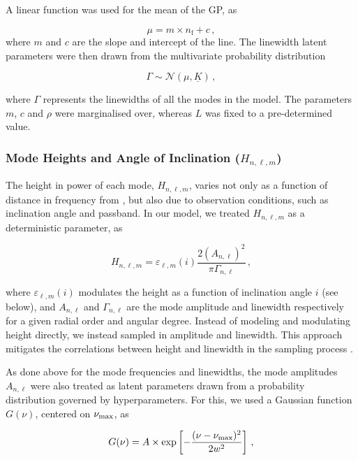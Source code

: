A linear function was used for the mean of the GP, as

\begin{equation}\label{eq:gpmean}
	\mu = m \times n_{\textrm{f}} + c\, ,
\end{equation}
where $m$ and $c$ are the slope and intercept of the line. The linewidth latent parameters were then drawn from the multivariate probability distribution

\begin{equation}\label{eq:gammagp}
	\Gamma \sim \mathcal{N}(\mu, \underline{K})\, ,
\end{equation}

\noindent where $\Gamma$ represents the linewidths of all the modes in the model. The parameters $m$, $c$ and $\rho$ were marginalised over, whereas $L$ was fixed to a pre-determined value.

\subsubsection{Mode Heights and Angle of Inclination ($H_{n,\ell,m}$)}
The height in power of each mode, $H_{n, \ell, m}$, varies not only as a function of distance in frequency from \numax, but also due to observation conditions, such as inclination angle and passband. In our model, we treated $H_{n, \ell, m}$ as a deterministic parameter, as

\begin{equation}\label{eq:height}
	H_{n, \ell, m} =  \varepsilon_{\ell, m}(i) \frac{2 (A_{n, \ell})^2}{\pi \Gamma_{n, \ell}}\, ,
\end{equation}

\noindent where $\varepsilon_{\ell, m}(i)$ modulates the height as a function of inclination angle $i$ (see below), and $A_{n, \ell}$ and $\Gamma_{n, \ell}$ are the mode amplitude and linewidth respectively for a given radial order and angular degree. Instead of modeling and modulating height directly, we instead sampled in amplitude and linewidth. This approach mitigates the correlations between height and linewidth in the sampling process \cite{toutain+appourchaux1994}.

As done above for the mode frequencies and linewidths, the mode amplitudes $A_{n,\ell}$ were also treated as latent parameters drawn from a probability distribution governed by hyperparameters. For this, we used a Gaussian function $G(\nu)$, centered on $\mbox{$\nu_{\rm max}$}$, as

\begin{equation}\label{eq:amplitude}
	G(\nu) = A \times \exp\left[-\frac{(\nu - \mbox{$\nu_{\rm max}$})^2}{2w^2}\right]\, ,
\end{equation}

